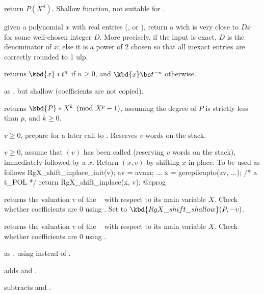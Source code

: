  return $P(X^d)$. Shallow function, not
suitable for .

 given a polynomial $x$ with real entries
(,  or ), return a  wich is very close
to $D x$ for some well-chosen integer $D$. More precisely, if the input is
exact, $D$ is the denominator of $x$; else it is a power of $2$ chosen
so that all inexact entries are correctly rounded to 1 ulp.


 returns $\kbd{x} * t^n$ if $n\geq 0$,
and $\kbd{x} \bs t^{-n}$ otherwise.

 as , but
shallow (coefficients are not copied).

 returns $\kbd{P} * X^k
\pmod {X^p-1}$, assuming the degree of $P$ is strictly less than $p$, and
$k\geq 0$.

 $v \geq 0$, prepare for a later
call to . Reserves $v$ words on the stack.

 $v \geq 0$, assume that
$(v)$ has been called (reserving $v$ words on the
stack), immediately followed by a  $x$. Return $(x,v)$
by shifting $x$ in place. To be used as follows
\bprog
  RgX_shift_inplace_init(v);
  av = avma;
  ...
  x = gerepileupto(av, ...); /* a t_POL */
  return RgX_shift_inplace(x, v);
@eprog

 returns the valuation $v$ of the
~ with respect to its main variable $X$. Check whether
coefficients are $0$ using . Set  to
$\kbd{RgX\_shift\_shallow}(P,-v)$.

 returns the valuation $v$ of the
~ with respect to its main variable $X$. Check whether
coefficients are $0$ using .

 as , using
 instead of .


 adds  and .

 subtracts  and .

